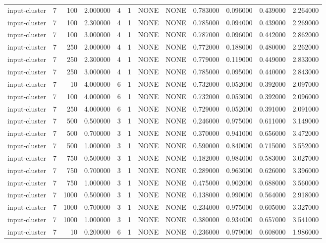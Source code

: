 \begin{tabular}{lrrrllllrrrr}
input-cluster & 7 & 100 & 2.000000 & 4 & 1 & NONE & NONE & 0.783000 & 0.096000 & 0.439000 & 2.264000 \\
input-cluster & 7 & 100 & 2.300000 & 4 & 1 & NONE & NONE & 0.785000 & 0.094000 & 0.439000 & 2.269000 \\
input-cluster & 7 & 100 & 3.000000 & 4 & 1 & NONE & NONE & 0.787000 & 0.096000 & 0.442000 & 2.862000 \\
input-cluster & 7 & 250 & 2.000000 & 4 & 1 & NONE & NONE & 0.772000 & 0.188000 & 0.480000 & 2.262000 \\
input-cluster & 7 & 250 & 2.300000 & 4 & 1 & NONE & NONE & 0.779000 & 0.119000 & 0.449000 & 2.833000 \\
input-cluster & 7 & 250 & 3.000000 & 4 & 1 & NONE & NONE & 0.785000 & 0.095000 & 0.440000 & 2.843000 \\
input-cluster & 7 & 10 & 4.000000 & 6 & 1 & NONE & NONE & 0.732000 & 0.052000 & 0.392000 & 2.097000 \\
input-cluster & 7 & 100 & 4.000000 & 6 & 1 & NONE & NONE & 0.732000 & 0.053000 & 0.392000 & 2.096000 \\
input-cluster & 7 & 250 & 4.000000 & 6 & 1 & NONE & NONE & 0.729000 & 0.052000 & 0.391000 & 2.091000 \\
input-cluster & 7 & 500 & 0.500000 & 3 & 1 & NONE & NONE & 0.246000 & 0.975000 & 0.611000 & 3.149000 \\
input-cluster & 7 & 500 & 0.700000 & 3 & 1 & NONE & NONE & 0.370000 & 0.941000 & 0.656000 & 3.472000 \\
input-cluster & 7 & 500 & 1.000000 & 3 & 1 & NONE & NONE & 0.590000 & 0.840000 & 0.715000 & 3.552000 \\
input-cluster & 7 & 750 & 0.500000 & 3 & 1 & NONE & NONE & 0.182000 & 0.984000 & 0.583000 & 3.027000 \\
input-cluster & 7 & 750 & 0.700000 & 3 & 1 & NONE & NONE & 0.289000 & 0.963000 & 0.626000 & 3.396000 \\
input-cluster & 7 & 750 & 1.000000 & 3 & 1 & NONE & NONE & 0.475000 & 0.902000 & 0.688000 & 3.560000 \\
input-cluster & 7 & 1000 & 0.500000 & 3 & 1 & NONE & NONE & 0.138000 & 0.990000 & 0.564000 & 2.918000 \\
input-cluster & 7 & 1000 & 0.700000 & 3 & 1 & NONE & NONE & 0.234000 & 0.975000 & 0.605000 & 3.327000 \\
input-cluster & 7 & 1000 & 1.000000 & 3 & 1 & NONE & NONE & 0.380000 & 0.934000 & 0.657000 & 3.541000 \\
input-cluster & 7 & 10 & 0.200000 & 6 & 1 & NONE & NONE & 0.236000 & 0.979000 & 0.608000 & 1.986000 \\

\end{tabular}
